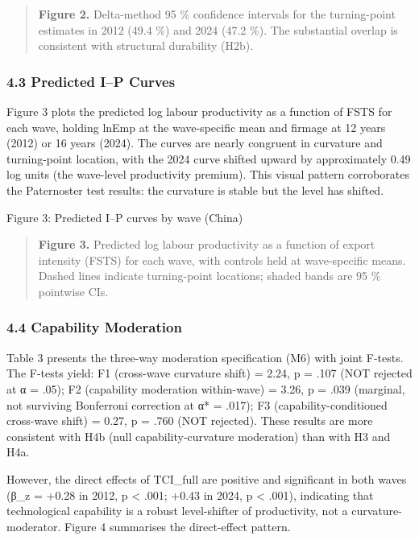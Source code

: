\documentclass[
  12pt,a4paper]{article}
\begin{document}
\begin{quote}
\textbf{Figure 2.} Delta-method 95 \% confidence intervals for the
turning-point estimates in 2012 (49.4 \%) and 2024 (47.2 \%). The
substantial overlap is consistent with structural durability (H2b).
\end{quote}

\hypertarget{predicted-ip-curves}{%
\subsubsection{4.3 Predicted I--P Curves}\label{predicted-ip-curves}}

Figure 3 plots the predicted log labour productivity as a function of
FSTS for each wave, holding lnEmp at the wave-specific mean and firmage
at 12 years (2012) or 16 years (2024). The curves are nearly congruent
in curvature and turning-point location, with the 2024 curve shifted
upward by approximately 0.49 log units (the wave-level productivity
premium). This visual pattern corroborates the Paternoster test results:
the curvature is stable but the level has shifted.

Figure 3: Predicted I--P curves by wave (China)

\begin{quote}
\textbf{Figure 3.} Predicted log labour productivity as a function of
export intensity (FSTS) for each wave, with controls held at
wave-specific means. Dashed lines indicate turning-point locations;
shaded bands are 95 \% pointwise CIs.
\end{quote}

\hypertarget{capability-moderation}{%
\subsubsection{4.4 Capability Moderation}\label{capability-moderation}}

Table 3 presents the three-way moderation specification (M6) with joint
F-tests. The F-tests yield: F1 (cross-wave curvature shift) = 2.24, p =
.107 (NOT rejected at α = .05); F2 (capability moderation within-wave) =
3.26, p = .039 (marginal, not surviving Bonferroni correction at α* =
.017); F3 (capability-conditioned cross-wave shift) = 0.27, p = .760
(NOT rejected). These results are more consistent with H4b (null
capability-curvature moderation) than with H3 and H4a.

However, the direct effects of TCI\_full are positive and significant in
both waves (β\_z = +0.28 in 2012, p \textless{} .001; +0.43 in 2024, p
\textless{} .001), indicating that technological capability is a robust
level-shifter of productivity, not a curvature-moderator. Figure 4
summarises the direct-effect pattern.
\end{document}
